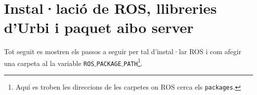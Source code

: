 \documentclass[12pt,a4paper,final,twoside]{article}
\begin{document}
\label{Referencies}




\appendix
\clearpage %
\addappheadtotoc
\appendixpage

\section{Instal·lació de ROS, llibreries d'Urbi i paquet aibo server}

\paragraph{}Tot seguit es mostren els passos a seguir per tal d'instal·lar ROS i com afegir una carpeta al la variable \texttt{ROS$\_$PACKAGE$\_$PATH}\footnote{Aquí es troben les direccions de les carpetes on ROS cerca els \texttt{packages}.}.
\end{document}
